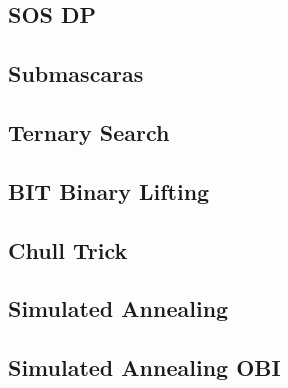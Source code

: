 \subsection{	SOS DP}
\raggedbottom
\hrulefill
\subsection{	Submascaras}
\raggedbottom
\hrulefill
\subsection{	Ternary Search}
\raggedbottom
\hrulefill
\subsection{	BIT Binary Lifting}
\raggedbottom
\hrulefill
\subsection{	Chull Trick}
\raggedbottom
\hrulefill
\subsection{	Simulated Annealing}
\raggedbottom
\hrulefill
\subsection{	Simulated Annealing OBI}
\raggedbottom
\hrulefill

